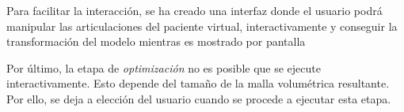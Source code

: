 Para facilitar la interacción, se ha creado una interfaz donde el usuario podrá manipular las articulaciones del paciente virtual, interactivamente y conseguir la transformación del modelo mientras es mostrado por pantalla 

Por último, la etapa de \emph{optimización} no es posible que se ejecute interactivamente. Esto depende del tamaño de la malla volumétrica resultante. Por ello, se deja a elección del usuario cuando se procede a ejecutar esta etapa.


